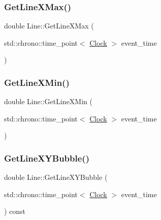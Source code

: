 \mbox{\label{classLine_a1393a4dcd9fa9e1ab1653c37d76c8c3a}} 
\subsubsection{\texorpdfstring{Get\+Line\+X\+Max()}{GetLineXMax()}}
{\footnotesize\ttfamily double Line\+::\+Get\+Line\+X\+Max (\begin{DoxyParamCaption}\item[{std\+::chrono\+::time\+\_\+point$<$ \mbox{\hyperlink{universe_8h_a0ef8d951d1ca5ab3cfaf7ab4c7a6fd80}{Clock}} $>$}]{event\+\_\+time }\end{DoxyParamCaption})\hspace{0.3cm}{\ttfamily [inline]}}

\mbox{\label{classLine_ac4a6e8f232b529169d91b9f44496933b}} 
\subsubsection{\texorpdfstring{Get\+Line\+X\+Min()}{GetLineXMin()}}
{\footnotesize\ttfamily double Line\+::\+Get\+Line\+X\+Min (\begin{DoxyParamCaption}\item[{std\+::chrono\+::time\+\_\+point$<$ \mbox{\hyperlink{universe_8h_a0ef8d951d1ca5ab3cfaf7ab4c7a6fd80}{Clock}} $>$}]{event\+\_\+time }\end{DoxyParamCaption})\hspace{0.3cm}{\ttfamily [inline]}}

\mbox{\label{classLine_a8752cfce7330fbeda936778b77e534d0}} 
\subsubsection{\texorpdfstring{Get\+Line\+X\+Y\+Bubble()}{GetLineXYBubble()}}
{\footnotesize\ttfamily double Line\+::\+Get\+Line\+X\+Y\+Bubble (\begin{DoxyParamCaption}\item[{std\+::chrono\+::time\+\_\+point$<$ \mbox{\hyperlink{universe_8h_a0ef8d951d1ca5ab3cfaf7ab4c7a6fd80}{Clock}} $>$}]{event\+\_\+time }\end{DoxyParamCaption}) const\hspace{0.3cm}{\ttfamily [inline]}}

